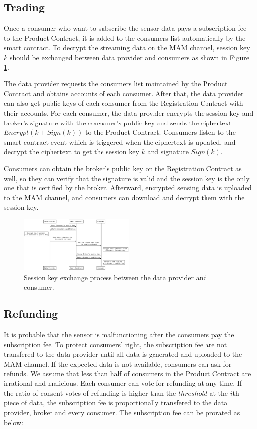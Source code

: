\documentclass[journal,a4paper]{IEEEtran}
\begin{document}
\subsection{Trading}
Once a consumer who want to subscribe the sensor data pays a subscription fee to the Product Contract, it is added to the consumers list automatically by the smart contract. To decrypt the streaming data on the MAM channel, session key $k$ should be exchanged between data provider and consumers as shown in Figure \ref{fig:key_exchange}. 

The data provider requests the consumers list maintained by the Product Contract and obtains accounts of each consumer. After that, the data provider can also get public keys of each consumer from the Registration Contract with their accounts. For each consumer, the data provider encrypts the session key and broker's signature with the consumer's public key and sends the ciphertext $Encrypt(k + Sign(k))$ to the Product Contract. Consumers listen to the smart contract event which is triggered when the ciphertext is updated, and decrypt the ciphertext to get the session key $k$ and signature $Sign(k)$. 

Consumers can obtain the broker's public key on the Registration Contract as well, so they can verify that the signature is valid and the session key is the only one that is certified by the broker. Afterward, encrypted sensing data is uploaded to the MAM channel, and consumers can download and decrypt them with the session key.

\begin{figure}[h]
	\centering
	\includegraphics[width=0.5\textwidth]{key_exchange}
	\caption{Session key exchange process between the data provider and consumer.}
	\label{fig:key_exchange}
\end{figure}

\subsection{Refunding}
It is probable that the sensor is malfunctioning after the consumers pay the subscription fee. To protect consumers' right, the subscription fee are not transfered to the data provider until all data is generated and uploaded to the MAM channel. If the expected data is not available, consumers can ask for refunds. We assume that less than half of consumers in the Product Contract are irrational and malicious. Each consumer can vote for refunding at any time. If the ratio of consent votes of refunding is higher than the $threshold$ at the $i$th piece of data, the subscription fee is proportionally transfered to the data provider, broker and every consumer. The subscription fee can be prorated as below:
\end{document}
